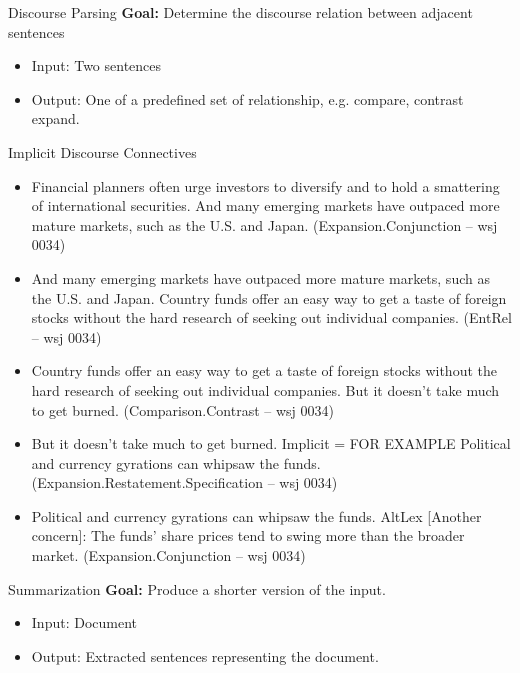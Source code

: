\documentclass{beamer}
\begin{document}
\begin{frame}{Discourse Parsing}
  \textbf{Goal:} Determine the discourse relation between adjacent sentences

  \begin{itemize}
  \item Input: Two sentences
  \item Output: One of a predefined set of relationship, e.g. compare, contrast expand.
  \end{itemize}  
\end{frame}

\begin{frame}{Implicit Discourse Connectives}
  \begin{itemize}
  \item Financial planners often urge investors to diversify and to
    hold a smattering of international securities. And many emerging
    markets have outpaced more mature markets, such as the U.S. and
    Japan.  (Expansion.Conjunction – wsj 0034) 
  \item And many emerging
    markets have outpaced more mature markets, such as the U.S. and
    Japan. Country funds offer an easy way to get a taste of foreign
    stocks without the hard research of seeking out individual
    companies.  (EntRel – wsj 0034) 
  \item Country funds offer an easy
    way to get a taste of foreign stocks without the hard research of
    seeking out individual companies. But it doesn’t take much to get
    burned.  (Comparison.Contrast – wsj 0034) 
  \item But it doesn’t take
    much to get burned. Implicit = FOR EXAMPLE Political and currency
    gyrations can whipsaw the funds.
    (Expansion.Restatement.Specification – wsj 0034) 
  \item Political and
    currency gyrations can whipsaw the funds. AltLex [Another
    concern]: The funds’ share prices tend to swing more than the
    broader market.  (Expansion.Conjunction – wsj 0034)
  \end{itemize}
\end{frame}

\begin{frame}{Summarization}
  \textbf{Goal:} Produce a shorter version of the input.

  \begin{itemize}
  \item Input: Document
  \item Output: Extracted sentences representing the document.
  \end{itemize}  
\end{frame}
\end{document}
